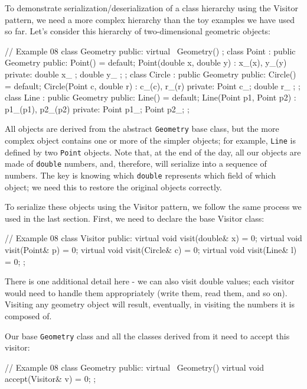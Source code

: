 To demonstrate serialization/deserialization of a class hierarchy using the Visitor pattern, we need a more complex hierarchy than the toy examples we have used so far. Let's consider this hierarchy of two-dimensional geometric objects:

\begin{code}
// Example 08
class Geometry {
  public:
  virtual ~Geometry() {}
};
class Point : public Geometry {
  public:
  Point() = default;
  Point(double x, double y) : x_(x), y_(y) {}
  private:
  double x_ {};
  double y_ {};
};
class Circle : public Geometry {
  public:
  Circle() = default;
  Circle(Point c, double r) : c_(c), r_(r) {}
  private:
  Point c_;
  double r_ {};
};
class Line : public Geometry {
  public:
  Line() = default;
  Line(Point p1, Point p2) : p1_(p1), p2_(p2) {}
  private:
  Point p1_;
  Point p2_;
};
\end{code}

All objects are derived from the abstract \texttt{Geometry} base class, but the more complex object contains one or more of the simpler objects; for example, \texttt{Line} is defined by two \texttt{Point} objects. Note that, at the end of the day, all our objects are made of \texttt{double} numbers, and, therefore, will serialize into a sequence of numbers. The key is knowing which \texttt{double} represents which field of which object; we need this to restore the original objects correctly.

To serialize these objects using the Visitor pattern, we follow the same process we used in the last section. First, we need to declare the base Visitor class:

\begin{code}
// Example 08
class Visitor {
public:
  virtual void visit(double& x) = 0;
  virtual void visit(Point& p) = 0;
  virtual void visit(Circle& c) = 0;
  virtual void visit(Line& l) = 0;
};
\end{code}

There is one additional detail here - we can also visit double values; each visitor would need to handle them appropriately (write them, read them, and so on). Visiting any geometry object will result, eventually, in visiting the numbers it is composed of.

Our base \texttt{Geometry} class and all the classes derived from it need to accept this visitor:

\begin{code}
// Example 08
class Geometry {
  public:
  virtual ~Geometry() {}
  virtual void accept(Visitor& v) = 0;
};
\end{code}

